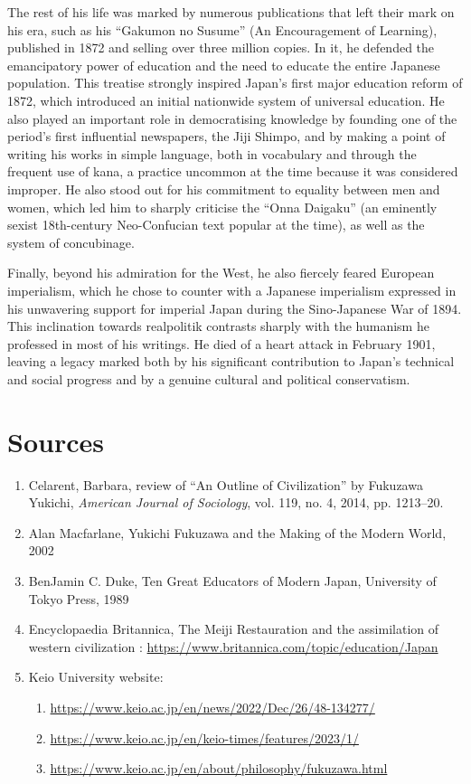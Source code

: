 \documentclass[11pt,a4paper]{article}
\begin{document}
The rest of his life was marked by numerous publications that left their mark on his era, such as his ``Gakumon no Susume'' (An Encouragement of Learning), published in 1872 and selling over three million copies. In it, he defended the emancipatory power of education and the need to educate the entire Japanese population. This treatise strongly inspired Japan's first major education reform of 1872, which introduced an initial nationwide system of universal education. He also played an important role in democratising knowledge by founding one of the period's first influential newspapers, the Jiji Shimpo, and by making a point of writing his works in simple language, both in vocabulary and through the frequent use of kana, a practice uncommon at the time because it was considered improper. He also stood out for his commitment to equality between men and women, which led him to sharply criticise the ``Onna Daigaku'' (an eminently sexist 18th-century Neo-Confucian text popular at the time), as well as the system of concubinage.

Finally, beyond his admiration for the West, he also fiercely feared European imperialism, which he chose to counter with a Japanese imperialism expressed in his unwavering support for imperial Japan during the Sino-Japanese War of 1894. This inclination towards realpolitik contrasts sharply with the humanism he professed in most of his writings. He died of a heart attack in February 1901, leaving a legacy marked both by his significant contribution to Japan's technical and social progress and by a genuine cultural and political conservatism.

\section{Sources}
\small

\begin{enumerate}[leftmargin=1.3em,itemsep=.18em,topsep=.25em]
\def\labelenumi{\arabic{enumi}.}
\item
  Celarent, Barbara, review of ``An Outline of Civilization'' by Fukuzawa Yukichi, \emph{American Journal of Sociology}, vol. 119, no. 4, 2014, pp. 1213--20.
\item
  Alan Macfarlane, Yukichi Fukuzawa and the Making of the Modern World, 2002
\item
  BenJamin C. Duke, Ten Great Educators of Modern Japan, University of Tokyo Press, 1989
\item
  Encyclopaedia Britannica, The Meiji Restauration and the assimilation of western civilization : \url{https://www.britannica.com/topic/education/Japan}
\item
  Keio University website:

\begin{enumerate}[leftmargin=1.3em,itemsep=.18em,topsep=.25em]
  \def\labelenumii{\alph{enumii}.}
  \item
    \url{https://www.keio.ac.jp/en/news/2022/Dec/26/48-134277/}
  \item
    \url{https://www.keio.ac.jp/en/keio-times/features/2023/1/}
  \item
    \url{https://www.keio.ac.jp/en/about/philosophy/fukuzawa.html}
  \end{enumerate}
\end{enumerate}
\end{document}
